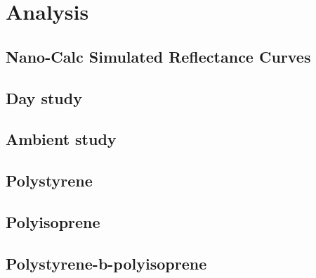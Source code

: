 \documentclass[MasterThesisMain.tex]{subfiles}
\begin{document}
	\chapter{Analysis} \label{ch.analysis}
	
	\section{Nano-Calc Simulated Reflectance Curves}
	
	\section{Day study}
	
	\section{Ambient study}
	
	\section{Polystyrene}
	
	\section{Polyisoprene}
	
	\section{Polystyrene-b-polyisoprene}
\end{document}
